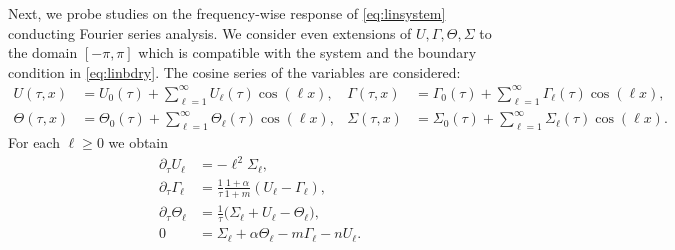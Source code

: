 \documentclass[a4paper,11pt]{article}
\def\l{{\ell}}
\theoremstyle{remark}
\begin{document}
{Next, we probe studies on the frequency-wise response of \eqref{eq:linsystem} conducting Fourier series analysis. We consider even extensions of $U,\Gamma,\Theta,\Sigma$ to the domain $[-\pi,\pi]$ which is compatible with the system and the boundary condition in \eqref{eq:linbdry}. The cosine series of the variables are considered:
\begin{align*}
 U(\tau,x) &= U_0(\tau) + \sum_{\ell=1}^\infty U_\ell(\tau)\cos(\l x), &
 \Gamma(\tau,x) &= \Gamma_0(\tau) + \sum_{\ell=1}^\infty \Gamma_\ell(\tau)\cos(\l x),\\
 \Theta(\tau,x) &= \Theta_0(\tau) + \sum_{\ell=1}^\infty \Theta_\ell(\tau)\cos(\l x), &
 \Sigma(\tau,x) &= \Sigma_0(\tau) + \sum_{\ell=1}^\infty \Sigma_\ell(\tau)\cos(\l x).
\end{align*}
For each $\ell\ge0$ we obtain
\begin{equation} \label{eq:l-system}
 \begin{aligned}
  \partial_\tau U_\ell &= -\l^2 \Sigma_\ell,\\
  \partial_\tau\Gamma_\ell &= \frac{1}{\tau}\frac{1+\alpha}{1+m}(U_\ell-\Gamma_\ell),\\
  \partial_\tau\Theta_\ell &= \frac{1}{\tau}\Big(\Sigma_\ell+ U_\ell -\Theta_\ell\Big),\\%
  0&=\Sigma_\ell + \alpha\Theta_\ell -m\Gamma_\ell - nU_\ell .
 \end{aligned}
\end{equation}


}
\end{document}

